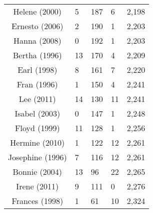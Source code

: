 \begin{table}[ht]
\begin{tabular}{cP{3cm}P{3cm}P{3cm}P{3cm}}
  Helene (2000) & 5 & 187 & 6 & 2,198 \\ 
  Ernesto (2006) & 2 & 190 & 1 & 2,203 \\ 
  Hanna (2008) & 0 & 192 & 1 & 2,203 \\ 
  Bertha (1996) & 13 & 170 & 4 & 2,209 \\ 
  Earl (1998) & 8 & 161 & 7 & 2,220 \\ 
  Fran (1996) & 1 & 150 & 4 & 2,241 \\ 
  Lee (2011) & 14 & 130 & 11 & 2,241 \\ 
  Isabel (2003) & 0 & 147 & 1 & 2,248 \\ 
  Floyd (1999) & 11 & 128 & 1 & 2,256 \\ 
  Hermine (2010) & 1 & 122 & 12 & 2,261 \\ 
  Josephine (1996) & 7 & 116 & 12 & 2,261 \\ 
  Bonnie (2004) & 13 & 96 & 22 & 2,265 \\ 
  Irene (2011) & 9 & 111 & 0 & 2,276 \\ 
  Frances (1998) & 1 & 61 & 10 & 2,324 \\ 
   \bottomrule
\end{tabular}
\end{table}
